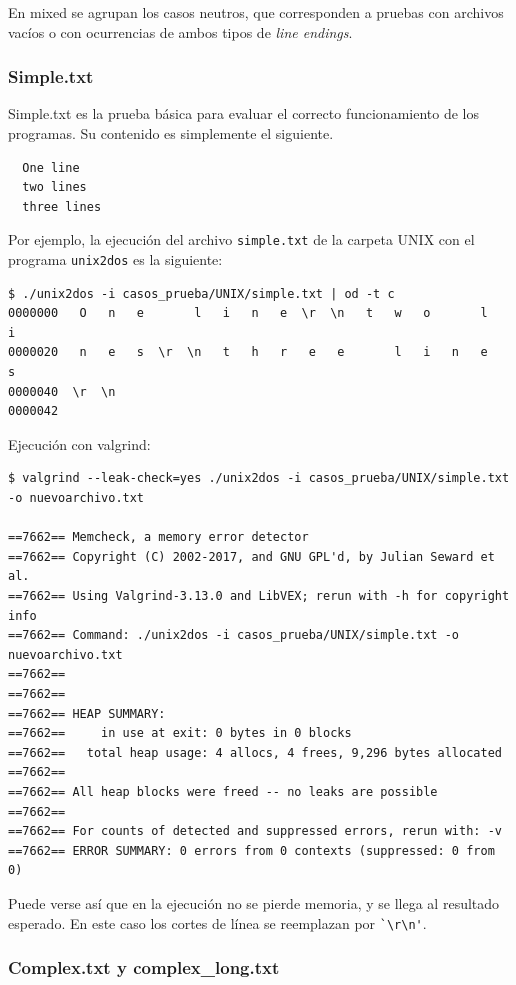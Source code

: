 \documentclass[a4paper,10pt, spanish]{article}
\begin{document}
En mixed se agrupan los casos neutros, que corresponden a pruebas con archivos vacíos o con ocurrencias
de ambos tipos de \textit{line endings}.

\subsubsection{Simple.txt}

Simple.txt es la prueba básica para evaluar el correcto funcionamiento de los programas.
Su contenido es simplemente el siguiente.

\begin{lstlisting}
  One line
  two lines
  three lines
\end{lstlisting}

Por ejemplo, la ejecución del archivo \lstinline{simple.txt} de la carpeta UNIX con el programa
\lstinline{unix2dos} es la siguiente:

\begin{lstlisting}
$ ./unix2dos -i casos_prueba/UNIX/simple.txt | od -t c
0000000   O   n   e       l   i   n   e  \r  \n   t   w   o       l   i
0000020   n   e   s  \r  \n   t   h   r   e   e       l   i   n   e   s
0000040  \r  \n
0000042
\end{lstlisting}
Ejecución con valgrind:
\begin{lstlisting}
$ valgrind --leak-check=yes ./unix2dos -i casos_prueba/UNIX/simple.txt -o nuevoarchivo.txt

==7662== Memcheck, a memory error detector
==7662== Copyright (C) 2002-2017, and GNU GPL'd, by Julian Seward et al.
==7662== Using Valgrind-3.13.0 and LibVEX; rerun with -h for copyright info
==7662== Command: ./unix2dos -i casos_prueba/UNIX/simple.txt -o nuevoarchivo.txt
==7662== 
==7662== 
==7662== HEAP SUMMARY:
==7662==     in use at exit: 0 bytes in 0 blocks
==7662==   total heap usage: 4 allocs, 4 frees, 9,296 bytes allocated
==7662== 
==7662== All heap blocks were freed -- no leaks are possible
==7662== 
==7662== For counts of detected and suppressed errors, rerun with: -v
==7662== ERROR SUMMARY: 0 errors from 0 contexts (suppressed: 0 from 0)
\end{lstlisting}

Puede verse así que en la ejecución no se pierde memoria, y se llega al resultado esperado.
En este caso los cortes de línea se reemplazan por \lstinline{`\r\n'}.

\subsubsection{Complex.txt y complex\_long.txt}
\end{document}
